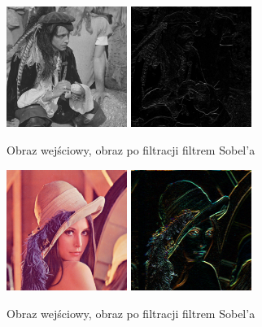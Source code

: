 \documentclass[final,a4paper,openany,12pt]{mwbk}
\begin{document}
\begin{figure}[H]
	\begin{center}
		\includegraphics[width=0.35\textwidth]{pirate_gray}
		\includegraphics[width=0.35\textwidth]{pirate_gray_highpassSobol_result}
	\end{center}
	\caption{Obraz wejściowy, obraz po filtracji filtrem Sobel'a}
\end{figure}

\begin{figure}[H]
	\begin{center}
		\includegraphics[width=0.35\textwidth]{lena_color}
		\includegraphics[width=0.35\textwidth]{lena_color_highpassSobol_result}
	\end{center}
	\caption{Obraz wejściowy, obraz po filtracji filtrem Sobel'a}
\end{figure}
\end{document}
